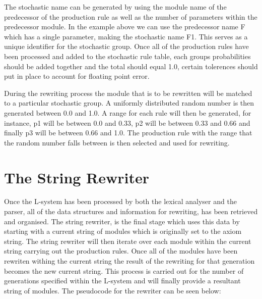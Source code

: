 \begin{flushleft}
\vspace{5mm}

The stochastic name can be generated by using the module name of the predecessor of the production rule as well as the number of parameters within the predecessor module. In the example above we can use the predecessor name F which has a single parameter, making the stochastic name F1. This serves as a unique identifier for the stochastic group. Once all of the production rules have been processed and added to the stochastic rule table, each groups probabilities should be added together and the total should equal 1.0, certain tolerences should put in place to account for floating point error. \\

\vspace{5mm}

During the rewriting process the module that is to be rewritten will be matched to a particular stochastic group. A uniformly distributed random number is then generated between 0.0 and 1.0. A range for each rule will then be generated, for instance, p1 will be between 0.0 and 0.33, p2 will be between 0.33 and 0.66 and finally p3 will be between 0.66 and 1.0. The production rule with the range that the random number falls between is then selected and used for rewriting. \\

\end{flushleft}

\section{The String Rewriter}

\begin{flushleft}

Once the L-system has been processed by both the lexical analyser and the parser, all of the data structures and information for rewriting, has been retrieved and organised. The string rewriter, is the final stage which uses this data by starting with a current string of modules which is originally set to the axiom string. The string rewriter will then iterate over each module within the current string carrying out the production rules. Once all of the modules have been rewriten withing the current string the result of the rewriting for that generation becomes the new current string. This process is carried out for the number of generations specified within the L-system and will finally provide a resultant string of modules. The pseudocode for the rewriter can be seen below: 


\end{flushleft}